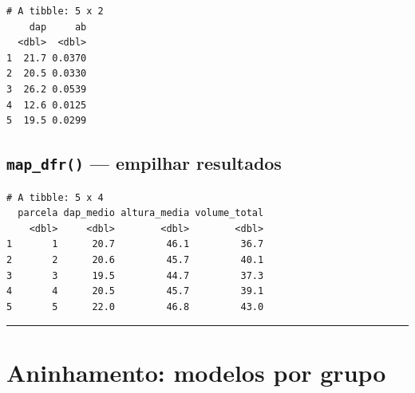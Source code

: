 \documentclass[
  letterpaper,
]{scrbook}
\newenvironment{Shaded}{\begin{snugshade}}{\end{snugshade}}
\newcommand{\AttributeTok}[1]{\textcolor[rgb]{0.40,0.45,0.13}{#1}}
\newcommand{\CommentTok}[1]{\textcolor[rgb]{0.37,0.37,0.37}{#1}}
\newcommand{\ControlFlowTok}[1]{\textcolor[rgb]{0.00,0.23,0.31}{\textbf{#1}}}
\newcommand{\DecValTok}[1]{\textcolor[rgb]{0.68,0.00,0.00}{#1}}
\newcommand{\FunctionTok}[1]{\textcolor[rgb]{0.28,0.35,0.67}{#1}}
\newcommand{\NormalTok}[1]{\textcolor[rgb]{0.00,0.23,0.31}{#1}}
\newcommand{\OtherTok}[1]{\textcolor[rgb]{0.00,0.23,0.31}{#1}}
\newcommand{\SpecialCharTok}[1]{\textcolor[rgb]{0.37,0.37,0.37}{#1}}
\begin{document}
\begin{verbatim}
# A tibble: 5 x 2
    dap     ab
  <dbl>  <dbl>
1  21.7 0.0370
2  20.5 0.0330
3  26.2 0.0539
4  12.6 0.0125
5  19.5 0.0299
\end{verbatim}

\subsection{\texorpdfstring{\texttt{map\_dfr()} --- empilhar
resultados}{map\_dfr() --- empilhar resultados}}\label{map_dfr-empilhar-resultados}

\begin{Shaded}
\end{Shaded}

\begin{verbatim}
# A tibble: 5 x 4
  parcela dap_medio altura_media volume_total
    <dbl>     <dbl>        <dbl>        <dbl>
1       1      20.7         46.1         36.7
2       2      20.6         45.7         40.1
3       3      19.5         44.7         37.3
4       4      20.5         45.7         39.1
5       5      22.0         46.8         43.0
\end{verbatim}

\begin{center}\rule{0.5\linewidth}{0.5pt}\end{center}

\section{Aninhamento: modelos por
grupo}\label{aninhamento-modelos-por-grupo}
\end{document}
